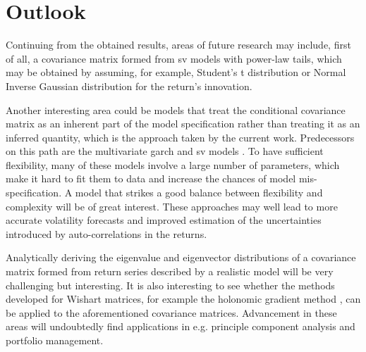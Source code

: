 \chapter{Outlook}
Continuing from the obtained results, areas of future research may
include, first of all, a covariance matrix formed from \gls{sv} models
with power-law tails, which may be obtained by assuming, for example,
Student's t distribution or Normal Inverse Gaussian distribution for
the return's innovation.

Another interesting area could be models that treat the conditional
covariance matrix as an inherent part of the model specification
rather than treating it as an inferred quantity, which is the approach
taken by the current work. Predecessors on this path are the
multivariate \gls{garch} and \gls{sv} models
\cite{Mikosch2009}. To have sufficient flexibility, many of these
models involve a large number of parameters, which make it hard to fit
them to data and increase the chances of model mis-specification. A
model that strikes a good balance between flexibility and complexity
will be of great interest.
These approaches may well lead to more accurate volatility forecasts
and improved estimation of the uncertainties introduced by
auto-correlations in the returns.

Analytically deriving the eigenvalue and eigenvector distributions of
a covariance matrix formed from return series described by a realistic
model will be very challenging but interesting. It is also interesting to
see whether the methods developed for Wishart matrices, for example
the holonomic gradient method \cite{Hashiguchi2012}, can be applied to
the aforementioned covariance matrices.
Advancement in these areas will undoubtedly find applications in
e.g. principle component analysis and portfolio management.

